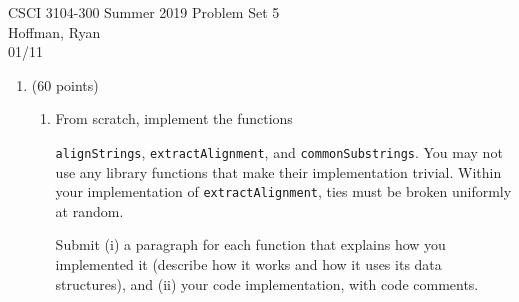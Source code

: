 \documentclass{article}
\begin{document}
CSCI 3104-300 Summer 2019 \hfill Problem Set 5 \\
Hoffman, Ryan \\
01/11

\hrulefill

\vspace{-3mm}
\begin{enumerate}
    
	\item (60 points) 
	\begin{enumerate}

	\item From scratch, implement the functions \par
	{\tt alignStrings}, {\tt extractAlignment}, and {\tt commonSubstrings}. 
	You may not use any library functions that make their implementation trivial. 
	Within your implementation of {\tt extractAlignment}, ties must be broken uniformly at random.
	
	Submit (i) a paragraph for each function that explains how you implemented it (describe how it works and how it uses its data structures), and (ii) your code implementation, with code comments. \label{q:align:code}
	

\end{enumerate}
\end{enumerate}
\end{document}
